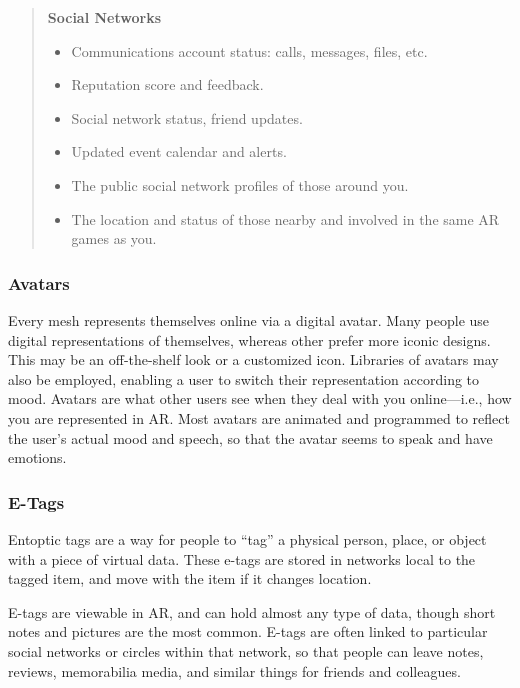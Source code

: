 \begin{quotation}
\noindent \textbf{Social Networks} \begin{itemize} \item Communications account status: calls, messages, files, etc. \item Reputation score and feedback. \item Social network status, friend updates. \item Updated event calendar and alerts. \item The public social network profiles of those around you. \item The location and status of those nearby and involved in the same AR games as you. \end{itemize} \end{quotation} 



\subsubsection{Avatars} 

Every mesh represents themselves online via a digital avatar. Many people use digital representations of themselves, whereas other prefer more iconic designs. This may be an off-the-shelf look or a customized icon. Libraries of avatars may also be employed, enabling a user to switch their representation according to mood. Avatars are what other users see when they deal with you online—i.e., how you are represented in AR. Most avatars are animated and programmed to reflect the user's actual mood and speech, so that the avatar seems to speak and have emotions. 

\subsubsection{E-Tags} 

Entoptic tags are a way for people to ``tag'' a physical person, place, or object with a piece of virtual data. These e-tags are stored in networks local to the tagged item, and move with the item if it changes location. 

E-tags are viewable in AR, and can hold almost any type of data, though short notes and pictures are the most common. E-tags are often linked to particular social networks or circles within that network, so that people can leave notes, reviews, memorabilia media, and similar things for friends and colleagues. 



